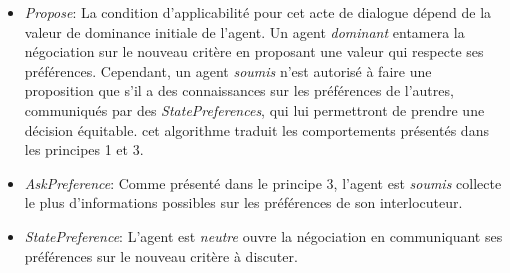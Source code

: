 	\begin{itemize}
		\item \emph{Propose}: La condition d'applicabilité pour cet acte de dialogue dépend de la valeur de dominance initiale de l'agent. Un agent \emph{dominant} entamera la négociation sur le nouveau critère en proposant une valeur qui respecte ses préférences. Cependant, un agent \emph{soumis} n'est autorisé à faire une proposition que s'il a des connaissances sur les préférences de l'autres,  communiqués par des \emph{StatePreferences}, qui lui permettront de prendre une décision équitable. cet algorithme traduit les comportements présentés dans les principes 1 et 3. 
		
		\item \emph{AskPreference}: Comme présenté dans le principe 3, l'agent est \emph{soumis} collecte le plus d'informations possibles sur les préférences de son interlocuteur. 
		\item \emph{StatePreference}: L'agent est \emph{neutre} ouvre la négociation en communiquant ses préférences sur le nouveau critère à discuter. 
		
	\end{itemize}
	
	
